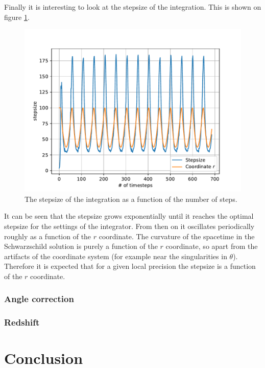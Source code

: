 \documentclass[pdftex,12pt,a4paper]{article}
\begin{document}
		Finally it is interesting to look at the stepsize of the integration. This is shown on figure \ref{stepsize}.
		\begin{figure}[H]
			\centering
			\includegraphics[scale=1]{./figs/planetStepsize.pdf}
			\caption{The stepsize of the integration as a function of the number of steps.}
			\label{stepsize}
		\end{figure}
		It can be seen that the stepsize grows exponentially until it reaches the optimal stepsize for the settings of the integrator. From then on it oscillates periodically roughly as a function of the $r$ coordinate. The curvature of the spacetime in the Schwarzschild solution is purely a function of the $r$ coordinate, so apart from the artifacts of the coordinate system (for example near the singularities in $\theta$). Therefore it is expected that for a given local precision the stepsize is a function of the $r$ coordinate.
	\subsubsection{Angle correction}
	
	\subsubsection{Redshift}
	
	\section{Conclusion}
		
	
    
\end{document}
